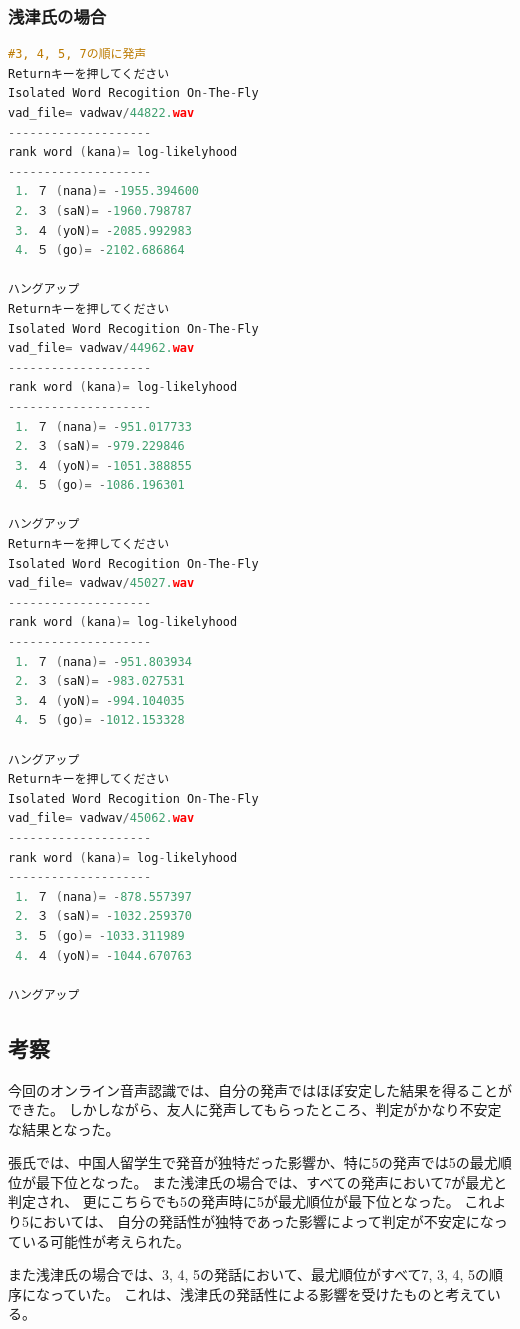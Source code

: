 \documentclass[11pt,a4paper, uplatex]{jsarticle}
\begin{document}
\subsubsection{浅津氏の場合}
\begin{lstlisting}[language=c, caption=\texttt{recog}実行結果(浅津氏)]
#3, 4, 5, 7の順に発声
Returnキーを押してください
Isolated Word Recogition On-The-Fly
vad_file= vadwav/44822.wav
--------------------
rank word (kana)= log-likelyhood
--------------------
 1. ７ (nana)= -1955.394600
 2. ３ (saN)= -1960.798787
 3. ４ (yoN)= -2085.992983
 4. ５ (go)= -2102.686864

ハングアップ   
Returnキーを押してください
Isolated Word Recogition On-The-Fly
vad_file= vadwav/44962.wav
--------------------
rank word (kana)= log-likelyhood
--------------------
 1. ７ (nana)= -951.017733
 2. ３ (saN)= -979.229846
 3. ４ (yoN)= -1051.388855
 4. ５ (go)= -1086.196301

ハングアップ   
Returnキーを押してください
Isolated Word Recogition On-The-Fly
vad_file= vadwav/45027.wav
--------------------
rank word (kana)= log-likelyhood
--------------------
 1. ７ (nana)= -951.803934
 2. ３ (saN)= -983.027531
 3. ４ (yoN)= -994.104035
 4. ５ (go)= -1012.153328

ハングアップ   
Returnキーを押してください
Isolated Word Recogition On-The-Fly
vad_file= vadwav/45062.wav
--------------------
rank word (kana)= log-likelyhood
--------------------
 1. ７ (nana)= -878.557397
 2. ３ (saN)= -1032.259370
 3. ５ (go)= -1033.311989
 4. ４ (yoN)= -1044.670763

ハングアップ   
\end{lstlisting}

\subsection{考察}
今回のオンライン音声認識では、自分の発声ではほぼ安定した結果を得ることができた。
しかしながら、友人に発声してもらったところ、判定がかなり不安定な結果となった。

張氏では、中国人留学生で発音が独特だった影響か、特に5の発声では5の最尤順位が最下位となった。
また浅津氏の場合では、すべての発声において7が最尤と判定され、
更にこちらでも5の発声時に5が最尤順位が最下位となった。
これより5においては、
自分の発話性が独特であった影響によって判定が不安定になっている可能性が考えられた。

また浅津氏の場合では、3, 4, 5の発話において、最尤順位がすべて7, 3, 4, 5の順序になっていた。
これは、浅津氏の発話性による影響を受けたものと考えている。
\end{document}
